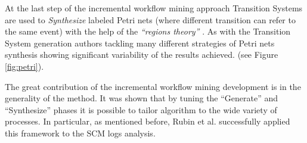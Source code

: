 At the last step of the incremental workflow mining approach Transition Systems are used to \textit{Synthesize} labeled Petri nets (where different transition can refer to the same event) with the help of the \textit{``regions theory''} \cite{citeulike:5128170}. As with the Transition System generation authors tackling many different strategies of Petri nets synthesis showing significant variability of the results achieved. (see Figure \ref{fig:petri}).

The great contribution of the incremental workflow mining development is in the generality of the method. It was shown that by tuning the ``Generate'' and ``Synthesize'' phases it is possible to tailor algorithm to the wide variety of processes. In particular, as mentioned before, Rubin et al. successfully applied this framework to the SCM logs analysis.